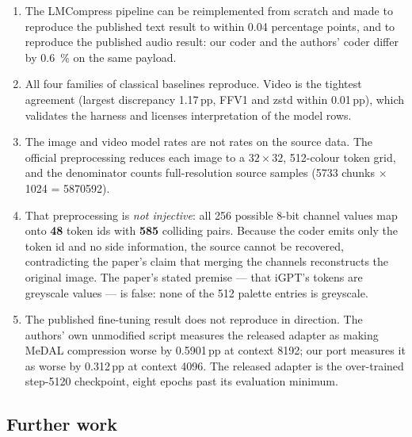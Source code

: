 \documentclass[11pt,a4paper]{article}
\begin{document}
\begin{enumerate}[leftmargin=1.4em,itemsep=3pt]
\item The LMCompress pipeline can be reimplemented from scratch and made to
      reproduce the published text result to within \num{0.04} percentage points,
      and to reproduce the published audio result: our coder and the authors'
      coder differ by \SI{0.6}{\%} on the same payload.
\item All four families of classical baselines reproduce. Video is the tightest
      agreement (largest discrepancy \num{1.17}\,pp, FFV1 and zstd within
      \num{0.01}\,pp), which validates the harness and licenses interpretation of
      the model rows.
\item The image and video model rates are not rates on the source data. The
      official preprocessing reduces each image to a $32\times32$, 512-colour
      token grid, and the denominator counts full-resolution source samples
      (\num{5733} chunks $\times$ \num{1024} = \num{5870592}).
\item That preprocessing is \emph{not injective}: all 256 possible 8-bit channel
      values map onto \textbf{48} token ids with \textbf{585} colliding pairs.
      Because the coder emits only the token id and no side information, the
      source cannot be recovered, contradicting the paper's claim that merging the
      channels reconstructs the original image. The paper's stated premise ---
      that iGPT's tokens are greyscale values --- is false: none of the 512
      palette entries is greyscale.
\item The published fine-tuning result does not reproduce in direction. The
      authors' own unmodified script measures the released adapter as making
      MeDAL compression worse by \num{0.5901}\,pp at context \num{8192}; our port
      measures it as worse by \num{0.312}\,pp at context \num{4096}. The released
      adapter is the over-trained step-\num{5120} checkpoint, eight epochs past
      its evaluation minimum.
\end{enumerate}

\subsection{Further work}
\label{ch:work}
\end{document}
